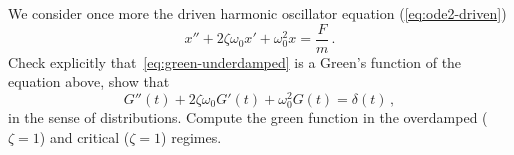\begin{ExerciseList}
  \Exercise[label=green] We consider once more the driven harmonic oscillator equation
  (\cf\cref{eq:ode2-driven})
  \begin{equation}
    x''+2\zeta\omega_0x'+\omega_0^2x=\frac{F}{m}\,.
  \end{equation}
  \Question Check explicitly that~\cref{eq:green-underdamped} is a Green's function of the
  equation above, \ie show that
  \begin{equation}
    G''(t)+2\zeta\omega_0G'(t)+\omega_0^2G(t)=\delta(t)\,,
  \end{equation}
  in the sense of distributions.
  \Question Compute the green function in the overdamped ($\zeta=1$) and critical
  ($\zeta=1$) regimes.
\end{ExerciseList}

